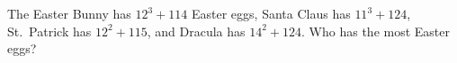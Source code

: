 The Easter Bunny has $12^3+114$ Easter eggs, Santa Claus has $11^3+124$, St.\ Patrick has $12^2+115$, and Dracula has $14^2+124$. Who has the most Easter eggs?
